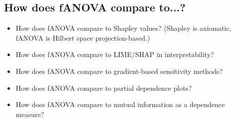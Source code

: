 \subsection*{How does fANOVA compare to...?}
\begin{itemize}
    \item How does fANOVA compare to Shapley values? (Shapley is axiomatic, fANOVA is Hilbert space projection-based.)
    \item How does fANOVA compare to LIME/SHAP in interpretability?
    \item How does fANOVA compare to gradient-based sensitivity methods?
    \item How does fANOVA compare to partial dependence plots?
    \item How does fANOVA compare to mutual information as a dependence measure?
\end{itemize}
